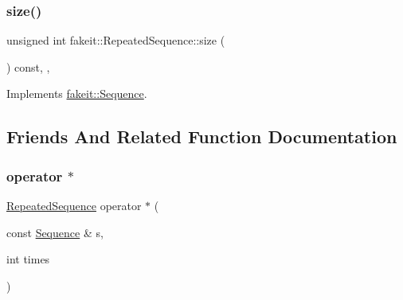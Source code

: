 \subsubsection{\texorpdfstring{size()}{size()}\hspace{0.1cm}{\footnotesize\ttfamily [9/9]}}
{\footnotesize\ttfamily unsigned int fakeit\+::\+Repeated\+Sequence\+::size (\begin{DoxyParamCaption}{ }\end{DoxyParamCaption}) const\hspace{0.3cm}{\ttfamily [inline]}, {\ttfamily [override]}, {\ttfamily [virtual]}}



Implements \mbox{\hyperlink{classfakeit_1_1Sequence_aa9a45b45fc715148832a9dfb7b555556}{fakeit\+::\+Sequence}}.



\subsection{Friends And Related Function Documentation}
\mbox{\label{classfakeit_1_1RepeatedSequence_ab856dedd10fec617583599e03f3c9a80}} 
\subsubsection{\texorpdfstring{operator $\ast$}{operator *}\hspace{0.1cm}{\footnotesize\ttfamily [1/18]}}
{\footnotesize\ttfamily \mbox{\hyperlink{classfakeit_1_1RepeatedSequence}{Repeated\+Sequence}} operator $\ast$ (\begin{DoxyParamCaption}\item[{const \mbox{\hyperlink{classfakeit_1_1Sequence}{Sequence}} \&}]{s,  }\item[{int}]{times }\end{DoxyParamCaption})\hspace{0.3cm}{\ttfamily [friend]}}

\mbox{\label{classfakeit_1_1RepeatedSequence_ae695b1e2c0f00bc6b9a49dd1efcb8f7b}} 
